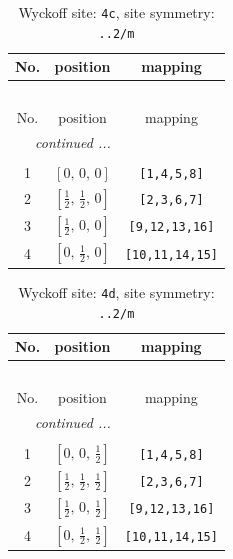 \documentclass[fleqn,8pt]{jsarticle}
\begin{document}
\renewcommand{\arraystretch}{1.2}
\begin{longtable}{ccc}
\caption{Wyckoff site: {\tt 4c}, site symmetry: {\tt ..2/m}}
 \\
 \hline \hline
No. & position & mapping \\ \hline \endfirsthead

\multicolumn{2}{l}{\tablename\ \thetable{}} \\
 \hline \hline
No. & position & mapping \\ \hline \endhead

 \hline \hline
\multicolumn{2}{r}{\footnotesize\it continued ...} \\ \endfoot

 \hline \hline
\multicolumn{2}{r}{} \\ \endlastfoot

1 & $\left[ 0,\, 0,\, 0 \right]$ & {\tt [1,4,5,8]} \\ \hline
2 & $\left[ \frac{1}{2},\, \frac{1}{2},\, 0 \right]$ & {\tt [2,3,6,7]} \\ \hline
3 & $\left[ \frac{1}{2},\, 0,\, 0 \right]$ & {\tt [9,12,13,16]} \\ \hline
4 & $\left[ 0,\, \frac{1}{2},\, 0 \right]$ & {\tt [10,11,14,15]} \\
\end{longtable}
\renewcommand{\arraystretch}{1.2}
\begin{longtable}{ccc}
\caption{Wyckoff site: {\tt 4d}, site symmetry: {\tt ..2/m}}
 \\
 \hline \hline
No. & position & mapping \\ \hline \endfirsthead

\multicolumn{2}{l}{\tablename\ \thetable{}} \\
 \hline \hline
No. & position & mapping \\ \hline \endhead

 \hline \hline
\multicolumn{2}{r}{\footnotesize\it continued ...} \\ \endfoot

 \hline \hline
\multicolumn{2}{r}{} \\ \endlastfoot

1 & $\left[ 0,\, 0,\, \frac{1}{2} \right]$ & {\tt [1,4,5,8]} \\ \hline
2 & $\left[ \frac{1}{2},\, \frac{1}{2},\, \frac{1}{2} \right]$ & {\tt [2,3,6,7]} \\ \hline
3 & $\left[ \frac{1}{2},\, 0,\, \frac{1}{2} \right]$ & {\tt [9,12,13,16]} \\ \hline
4 & $\left[ 0,\, \frac{1}{2},\, \frac{1}{2} \right]$ & {\tt [10,11,14,15]} \\
\end{longtable}
\end{document}
